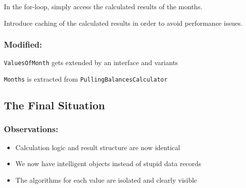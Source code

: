 \documentclass[a4paper,fleqn,titlepage,11pt]{article}
\begin{document}
In the for-loop, simply access the calculated results of the months.

Introduce caching of the calculated results in order to avoid performance issues.

\subsubsection*{Modified:}

\texttt{ValuesOfMonth} gets extended by an interface and variants

\texttt{Months} is extracted from \texttt{PullingBalancesCalculator}

\subsection*{The Final Situation}

\subsubsection*{Observations:}

\begin{itemize}
\item Calculation logic and result structure are now identical
\item We now have intelligent objects instead of stupid data records
\item The algorithms for each value are isolated and clearly visible
\end{itemize}
\end{document}
